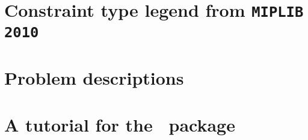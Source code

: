 	\section{Constraint type legend from \texttt{MIPLIB 2010}} \label{sec:miplibconstraint}
	
	
	\section{Problem descriptions} \label{sec:prob_desc}
	

	\section{A tutorial for the \julia\ package} \label{sec:tutorial}
	
	
	
	



